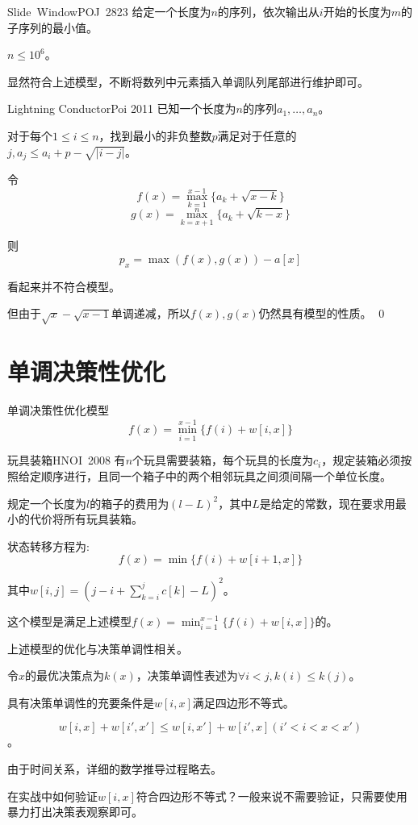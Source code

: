 \documentclass[9pt,dvipsnames,table,UTF8,aspectratio=169]{beamer}
\newenvironment{qedf}{%
	\begin{frame}[environment=qedqedframe]%
	}{%
	\qed
	\end{frame}%
}
\begin{document}
\begin{frame}{Slide\ Window}{POJ\ 2823}
	给定一个长度为$n$的序列，依次输出从$i$开始的长度为$m$的子序列的最小值。

	$n \le 10^6$。

	\pause
	显然符合上述模型，不断将数列中元素插入单调队列尾部进行维护即可。
\end{frame}

\begin{frame}{Lightning Conductor}{Poi 2011}
	已知一个长度为$n$的序列$a_1, \dots, a_n$。

	对于每个$1 \le i \le n$，找到最小的非负整数$p$满足对于任意的$j, a_j \le a_i + p - \sqrt{|i - j|}$。
\end{frame}

\begin{qedf}
	令$$f(x) = \max_{k = 1}^{x - 1} \{a_k + \sqrt{x - k}\} $$ $$ g(x) = \max_{k = x + 1}^{n} \{a_k + \sqrt{k - x}\}$$

	则$$p_x = \max(f(x), g(x)) - a[x]$$ \pause

	看起来并不符合模型。

	但由于$\sqrt{x} - \sqrt{x - 1}$单调递减，所以$f(x), g(x)$仍然具有模型的性质。
\end{qedf}

\section{单调决策性优化}
\begin{frame}{单调决策性优化模型}
	$$f(x) = \min_{i = 1}^{x - 1} \{f(i) + w[i, x]\}$$
\end{frame}

\begin{frame}{玩具装箱}{HNOI\ 2008}
	有$n$个玩具需要装箱，每个玩具的长度为$c_i$，规定装箱必须按照给定顺序进行，且同一个箱子中的两个相邻玩具之间须间隔一个单位长度。

	规定一个长度为$l$的箱子的费用为$(l - L)^2$，其中$L$是给定的常数，现在要求用最小的代价将所有玩具装箱。
\end{frame}

\begin{frame}
	状态转移方程为:$$f(x) = \min{\{f(i) + w[i + 1, x]\}}$$

	其中$w[i, j] = (j - i + \sum_{k = i}^{j}{c[k]} - L)^2$。
	
	这个模型是满足上述模型$f(x) = \min_{i = 1}^{x - 1} \{f(i) + w[i, x]\}$的。
\end{frame}

\begin{frame}
	上述模型的优化与决策单调性相关。

	令$x$的最优决策点为$k(x)$，决策单调性表述为$\forall i < j, k(i) \le k(j)$。

	具有决策单调性的充要条件是$w[i, x]$满足四边形不等式。

	$$w[i, x] + w[i', x'] \le w[i, x'] + w[i', x](i' < i < x < x')$$。

	由于时间关系，详细的数学推导过程略去。

	\pause
	在实战中如何验证$w[i, x]$符合四边形不等式？一般来说不需要验证，只需要使用暴力打出决策表观察即可。
\end{frame}
\end{document}

